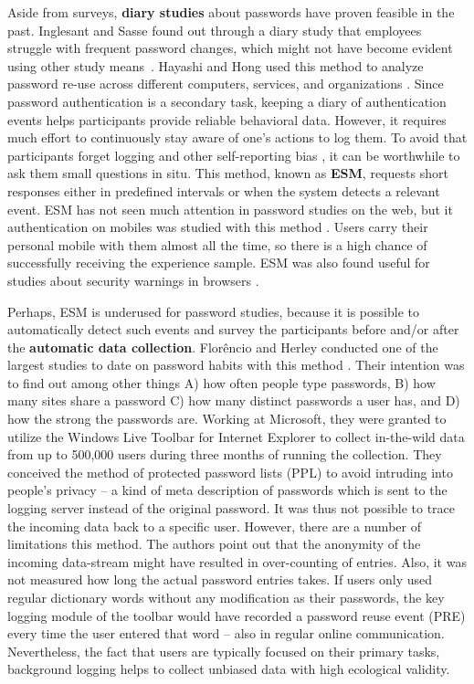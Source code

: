 Aside from surveys, \textbf{diary studies} about passwords have proven feasible in the past. Inglesant and Sasse found out through a diary study that employees struggle with frequent password changes, which might not have become evident using other study means \cite{Inglesant2010TrueCostOfUnusablePolicies}. Hayashi and Hong used this method to analyze password re-use across different computers, services, and organizations \cite{Hayashi2011DiaryStudyPWs}. Since password authentication is a secondary task, keeping a diary of authentication events helps participants provide reliable behavioral data. However, it requires much effort to continuously stay aware of one's actions to log them. To avoid that participants forget logging and other self-reporting bias \cite{Wash2017SelfReport}, it can be worthwhile to ask them small questions in situ. This method, known as \textbf{\gls{ESM}}, requests short responses either in predefined intervals or when the system detects a relevant event. ESM has not seen much attention in password studies on the web, but it authentication on mobiles was studied with this method \cite{Harbach2016HardLockLife}. Users carry their personal mobile with them almost all the time, so there is a high chance of successfully receiving the experience sample. ESM was also found useful for studies about security warnings in browsers \cite{Akhawe2013AliceInWarningland,Felt2016RethinkingConnectionSecurityIndicators}.

Perhaps, ESM is underused for password studies, because it is possible to automatically detect such events and survey the participants before and/or after the \textbf{automatic data collection}. Florêncio and Herley conducted one of the largest studies to date on password habits with this method \cite{Florencio2007LargeScaleStudyPasswordHabits}. Their intention was to find out among other things A) how often people type passwords, B) how many sites share a password C) how many distinct passwords a user has, and D) how the strong the passwords are. Working at Microsoft, they were granted to utilize the Windows Live Toolbar for Internet Explorer to collect in-the-wild data from up to 500,000 users during three months of running the collection. They conceived the method of protected password lists (PPL) to avoid intruding into people's privacy -- a kind of meta description of passwords which is sent to the logging server instead of the original password. It was thus not possible to trace the incoming data back to a specific user. However, there are a number of limitations this method. The authors point out that the anonymity of the incoming data-stream might have resulted in over-counting of entries. Also, it was not measured how long the actual password entries takes. If users only used regular dictionary words without any modification as their passwords, the key logging module of the toolbar would have recorded a password reuse event (PRE) every time the user entered that word -- also in regular online communication. Nevertheless, the fact that users are typically focused on their primary tasks, background logging helps to collect unbiased data with high ecological validity. 

